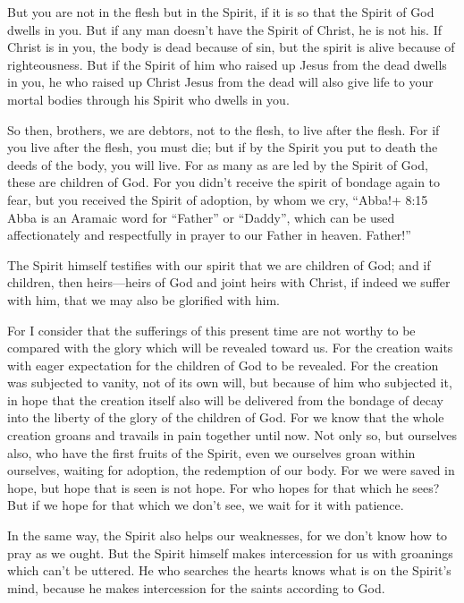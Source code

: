  But you are not in the flesh but in the Spirit, if it is so
that the Spirit of God dwells in you. But if any man doesn't have the
Spirit of Christ, he is not his.  If Christ is in you, the
body is dead because of sin, but the spirit is alive because of
righteousness.  But if the Spirit of him who raised up
Jesus from the dead dwells in you, he who raised up Christ Jesus from
the dead will also give life to your mortal bodies through his Spirit
who dwells in you.

 So then, brothers, we are debtors, not to the flesh, to
live after the flesh.  For if you live after the flesh, you
must die; but if by the Spirit you put to death the deeds of the body,
you will live.  For as many as are led by the Spirit of
God, these are children of God.  For you didn't receive the
spirit of bondage again to fear, but you received the Spirit of
adoption, by whom we cry, ``Abba!+ 8:15 Abba is an Aramaic word for
``Father'' or ``Daddy'', which can be used affectionately and
respectfully in prayer to our Father in heaven. Father!''

 The Spirit himself testifies with our spirit that we are
children of God;  and if children, then heirs---heirs of
God and joint heirs with Christ, if indeed we suffer with him, that we
may also be glorified with him.

 For I consider that the sufferings of this present time
are not worthy to be compared with the glory which will be revealed
toward us.  For the creation waits with eager expectation
for the children of God to be revealed.  For the creation
was subjected to vanity, not of its own will, but because of him who
subjected it, in hope  that the creation itself also will
be delivered from the bondage of decay into the liberty of the glory of
the children of God.  For we know that the whole creation
groans and travails in pain together until now.  Not only
so, but ourselves also, who have the first fruits of the Spirit, even we
ourselves groan within ourselves, waiting for adoption, the redemption
of our body.  For we were saved in hope, but hope that is
seen is not hope. For who hopes for that which he sees? 
But if we hope for that which we don't see, we wait for it with
patience.

 In the same way, the Spirit also helps our weaknesses, for
we don't know how to pray as we ought. But the Spirit himself makes
intercession for us with groanings which can't be uttered. 
He who searches the hearts knows what is on the Spirit's mind, because
he makes intercession for the saints according to God.

